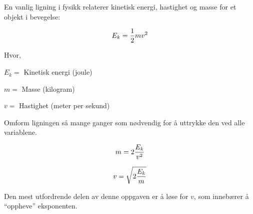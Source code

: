

En vanlig ligning i fysikk relaterer kinetisk energi, hastighet og masse for et objekt i bevegelse:

$$E_k = {1 \over 2} m v^2$$

\noindent
Hvor,

$E_k =$ Kinetisk energi (joule)

$m =$ Masse (kilogram)

$v =$ Hastighet (meter per sekund)

\vskip 10pt

Omform ligningen så mange ganger som nødvendig for å uttrykke den ved alle variablene.







$$m = 2 {E_k \over v^2}$$

\vskip 20pt

$$v = \sqrt {2 {E_k \over m}}$$







Den mest utfordrende delen av denne oppgaven er å løse for $v$, som innebærer å ``oppheve'' eksponenten.



